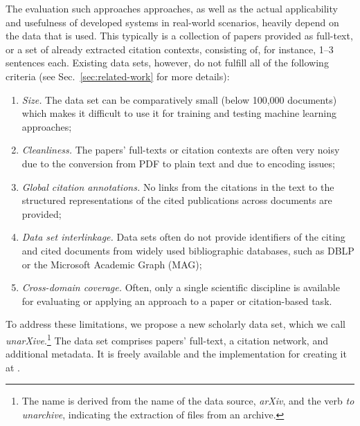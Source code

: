 The evaluation such approaches approaches, as well as the actual applicability and usefulness of developed systems in real-world scenarios, heavily depend on the data that is used. This typically is a collection of papers provided as full-text, or a set of already extracted citation contexts, consisting of, for instance, 1--3 sentences each. Existing data sets, however, do not fulfill all of the following criteria (see Sec.~\ref{sec:related-work} for more details):
\begin{enumerate}
 \item \textit{Size.} The data set can be comparatively small (below 100,000 documents) which makes it difficult to use it for training and testing machine learning approaches; 
 \item \textit{Cleanliness.} The papers' full-texts or citation contexts are often very noisy due to the conversion from PDF to plain text and due to encoding issues;
 \item \textit{Global citation annotations.} No links from the citations in the text to the structured representations of the cited publications across documents are provided;
 \item \textit{Data set interlinkage.} Data sets often do not provide identifiers of the citing and cited documents from widely used bibliographic databases, such as DBLP or the Microsoft Academic Graph (MAG);
 \item \textit{Cross-domain coverage.} Often, only a single scientific discipline is available for evaluating or applying an approach to a paper or citation-based task.
\end{enumerate}

To address these limitations, we propose a new scholarly data set, which we call \emph{unarXive}.\footnote{The name is derived from the name of the data source, \textit{arXiv}, and the verb \textit{to unarchive}, indicating the extraction of files from an archive.} The data set comprises papers' full-text, a citation network, and additional metadata.
It is freely available  and the implementation for creating it at .


